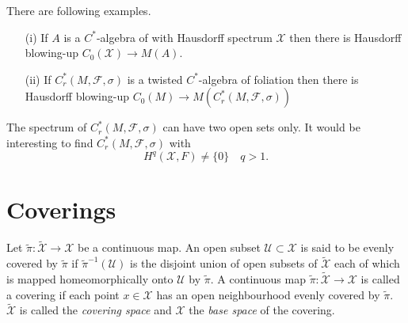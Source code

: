 \documentclass{beamer}
\theoremstyle{plain}
\newcommand{\F}{\mathcal{F}}
\newcommand{\sX}{\mathcal{X}}       %
\begin{document}
\begin{frame}
There are following examples.
\begin{enumerate}
	\item [(i)] If $A$ is a $C^*$-algebra of with Hausdorff spectrum $\sX$ then there is Hausdorff blowing-up $C_0\left(\sX \right) \to M\left( A\right)$. 
	\item[(ii)] If $C^*_r\left(M, \F, \sigma \right)$ is a twisted $C^*$-algebra of foliation then there is Hausdorff blowing-up $C_0\left(M \right) \to M\left( C^*_r\left(M, \F, \sigma \right)\right)$
	
\end{enumerate}
The spectrum of $C^*_r\left(M, \F, \sigma \right)$ can have two open sets only. It would be interesting to find $C^*_r\left(M, \F, \sigma \right)$ with
$$
H^q\left(\sX , F \right) \neq \{0\}\quad q > 1.
$$
\end{frame}

\section{Coverings}
\begin{frame}
	\begin{definition}\label{top_covering_defn} 
	Let $\widetilde{\pi}: \widetilde{\mathcal{X}} \to \mathcal{X}$ be a continuous map. An open subset $\mathcal{U} \subset \mathcal{X}$ is said to be \alert{ evenly covered } by $\widetilde{\pi}$ if $\widetilde{\pi}^{-1}(\mathcal U)$ is the disjoint union of open subsets of $\widetilde{\mathcal{X}}$ each of which is mapped homeomorphically onto $\mathcal{U}$ by $\widetilde{\pi}$. A continuous map $\widetilde{\pi}: \widetilde{\mathcal{X}} \to \mathcal{X}$ is called a \alert{covering} if each point $x \in \mathcal{X}$ has an open neighbourhood evenly covered by $\widetilde{\pi}$. $\widetilde{\mathcal{X}}$ is called the {
		\it covering space} and $\mathcal{X}$ the {\it base space} of the covering.
\end{definition}
\end{frame}
\end{document}

